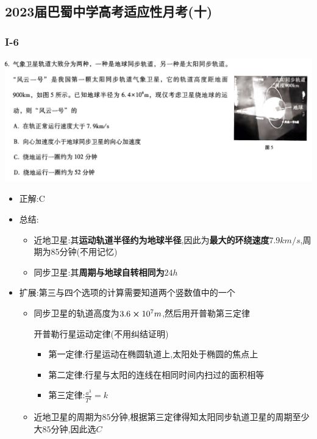 \documentclass{article}
\begin{document}
    \subsection{2023届巴蜀中学高考适应性月考(十)}
    \subsubsection{I-6}
    \includegraphics[width=50em,keepaspectratio]{./pictures/1.3-1.png}

    \begin{itemize}
        \item 正解:\quad C
        \item 总结:\quad 
        \begin{itemize}
            \item 近地卫星:其\textbf{运动轨道半径约为地球半径},因此为\textbf{最大的环绕速度$7.9km/s$},周期为85分钟(不用记忆)
            \item 同步卫星:其\textbf{周期与地球自转相同为$24h$}
        \end{itemize}
        \item 扩展:第三与四个选项的计算需要知道两个竖数值中的一个
            \begin{itemize}
                \item 同步卫星的轨道高度为$3.6 \cross 10^{7} m$,然后用开普勒第三定律
                \begin{thm*}
                    开普勒行星运动定律(不用纠结证明)
                    \begin{itemize}
                        \item 第一定律:行星运动在椭圆轨道上,太阳处于椭圆的焦点上
                        \item 第二定律:行星与太阳的连线在相同时间内扫过的面积相等
                        \item 第三定律:$\frac{a^{3}}{T^{2}} = k$
                    \end{itemize}
                \end{thm*}
                \item 近地卫星的周期为$85$分钟,根据第三定律得知太阳同步轨道卫星的周期至少大$85$分钟,因此选$C$
            \end{itemize}
    \end{itemize}
\end{document}
